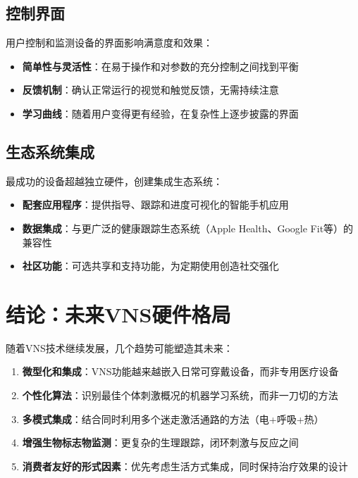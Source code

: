 \documentclass[
  Letterpaper,
]{scrbook}
\providecommand{\tightlist}{%
  \setlength{\itemsep}{0pt}\setlength{\parskip}{0pt}}\usepackage{longtable,booktabs,array}
\begin{document}
\subsection{控制界面}\label{ux63a7ux5236ux754cux9762}

用户控制和监测设备的界面影响满意度和效果：

\begin{itemize}
\tightlist
\item
  \textbf{简单性与灵活性}：在易于操作和对参数的充分控制之间找到平衡
\item
  \textbf{反馈机制}：确认正常运行的视觉和触觉反馈，无需持续注意
\item
  \textbf{学习曲线}：随着用户变得更有经验，在复杂性上逐步披露的界面
\end{itemize}

\subsection{生态系统集成}\label{ux751fux6001ux7cfbux7edfux96c6ux6210}

最成功的设备超越独立硬件，创建集成生态系统：

\begin{itemize}
\tightlist
\item
  \textbf{配套应用程序}：提供指导、跟踪和进度可视化的智能手机应用
\item
  \textbf{数据集成}：与更广泛的健康跟踪生态系统（Apple Health、Google
  Fit等）的兼容性
\item
  \textbf{社区功能}：可选共享和支持功能，为定期使用创造社交强化
\end{itemize}

\section{结论：未来VNS硬件格局}\label{ux7ed3ux8bbaux672aux6765vnsux786cux4ef6ux683cux5c40}

随着VNS技术继续发展，几个趋势可能塑造其未来：

\begin{enumerate}
\def\labelenumi{\arabic{enumi}.}
\item
  \textbf{微型化和集成}：VNS功能越来越嵌入日常可穿戴设备，而非专用医疗设备
\item
  \textbf{个性化算法}：识别最佳个体刺激概况的机器学习系统，而非一刀切的方法
\item
  \textbf{多模式集成}：结合同时利用多个迷走激活通路的方法（电+呼吸+热）
\item
  \textbf{增强生物标志物监测}：更复杂的生理跟踪，闭环刺激与反应之间
\item
  \textbf{消费者友好的形式因素}：优先考虑生活方式集成，同时保持治疗效果的设计
\end{enumerate}
\end{document}
